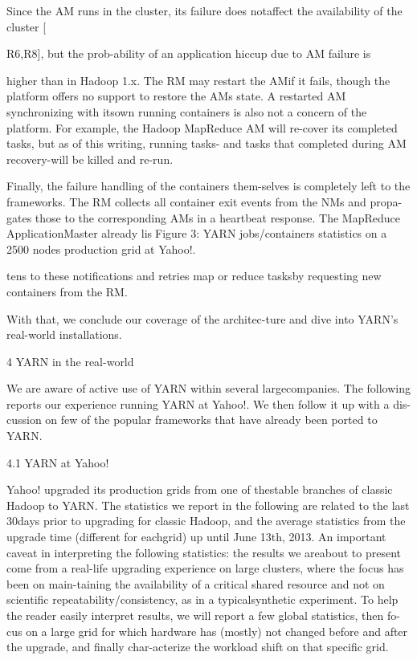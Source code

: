 Since the AM runs in the cluster, its failure does notaffect the availability of the cluster [

R6,R8], but the prob-ability of an application hiccup due to AM failure is

higher than in Hadoop 1.x. The RM may restart the AMif it fails, though the platform offers no support to restore
the AMs state. A restarted AM synchronizing with itsown running containers is also not a concern of the platform. For example, the Hadoop MapReduce AM will re-cover its completed tasks, but as of this writing, running
tasks- and tasks that completed during AM recovery-will be killed and re-run.

Finally, the failure handling of the containers them-selves is completely left to the frameworks. The RM collects all container exit events from the NMs and propa-gates those to the corresponding AMs in a heartbeat response. The MapReduce ApplicationMaster already lisFigure 3: YARN jobs/containers statistics on a 2500 nodes
production grid at Yahoo!.

tens to these notifications and retries map or reduce tasksby requesting new containers from the RM.

With that, we conclude our coverage of the architec-ture and dive into YARN's real-world installations.

4 YARN in the real-world

We are aware of active use of YARN within several largecompanies.
The following reports our experience running YARN at Yahoo!. We then follow it up with a dis-cussion on few of the popular frameworks that have already been ported to YARN.

4.1 YARN at Yahoo!

Yahoo! upgraded its production grids from one of thestable branches of classic Hadoop to YARN. The statistics we report in the following are related to the last 30days prior to upgrading for classic Hadoop, and the average statistics from the upgrade time (different for eachgrid) up until June 13th, 2013. An important caveat in
interpreting the following statistics: the results we areabout to present come from a real-life upgrading experience on large clusters, where the focus has been on main-taining the availability of a critical shared resource and
not on scientific repeatability/consistency, as in a typicalsynthetic experiment. To help the reader easily interpret
results, we will report a few global statistics, then fo-cus on a large grid for which hardware has (mostly) not
changed before and after the upgrade, and finally char-acterize the workload shift on that specific grid.

